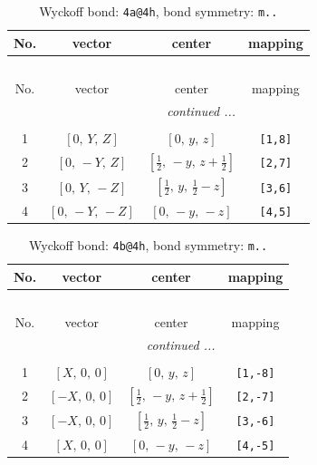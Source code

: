 \documentclass[fleqn,8pt]{jsarticle}
\begin{document}
\begin{longtable}{cccc}
\caption{Wyckoff bond: {\tt 4a@4h}, bond symmetry: {\tt m..}}
 \\
 \hline \hline
No. & vector & center & mapping \\ \hline \endfirsthead

\multicolumn{3}{l}{\tablename\ \thetable{}} \\
 \hline \hline
No. & vector & center & mapping \\ \hline \endhead

 \hline \hline
\multicolumn{3}{r}{\footnotesize\it continued ...} \\ \endfoot

 \hline \hline
\multicolumn{3}{r}{} \\ \endlastfoot

1 & $\left[ 0,\, Y,\, Z \right]$ & $\left[ 0,\, y,\, z \right]$ & {\tt [1,8]} \\ \hline
2 & $\left[ 0,\, - Y,\, Z \right]$ & $\left[ \frac{1}{2},\, - y,\, z + \frac{1}{2} \right]$ & {\tt [2,7]} \\ \hline
3 & $\left[ 0,\, Y,\, - Z \right]$ & $\left[ \frac{1}{2},\, y,\, \frac{1}{2} - z \right]$ & {\tt [3,6]} \\ \hline
4 & $\left[ 0,\, - Y,\, - Z \right]$ & $\left[ 0,\, - y,\, - z \right]$ & {\tt [4,5]} \\
\end{longtable}
\renewcommand{\arraystretch}{1.2}
\begin{longtable}{cccc}
\caption{Wyckoff bond: {\tt 4b@4h}, bond symmetry: {\tt m..}}
 \\
 \hline \hline
No. & vector & center & mapping \\ \hline \endfirsthead

\multicolumn{3}{l}{\tablename\ \thetable{}} \\
 \hline \hline
No. & vector & center & mapping \\ \hline \endhead

 \hline \hline
\multicolumn{3}{r}{\footnotesize\it continued ...} \\ \endfoot

 \hline \hline
\multicolumn{3}{r}{} \\ \endlastfoot

1 & $\left[ X,\, 0,\, 0 \right]$ & $\left[ 0,\, y,\, z \right]$ & {\tt [1,-8]} \\ \hline
2 & $\left[ - X,\, 0,\, 0 \right]$ & $\left[ \frac{1}{2},\, - y,\, z + \frac{1}{2} \right]$ & {\tt [2,-7]} \\ \hline
3 & $\left[ - X,\, 0,\, 0 \right]$ & $\left[ \frac{1}{2},\, y,\, \frac{1}{2} - z \right]$ & {\tt [3,-6]} \\ \hline
4 & $\left[ X,\, 0,\, 0 \right]$ & $\left[ 0,\, - y,\, - z \right]$ & {\tt [4,-5]} \\
\end{longtable}
\end{document}

